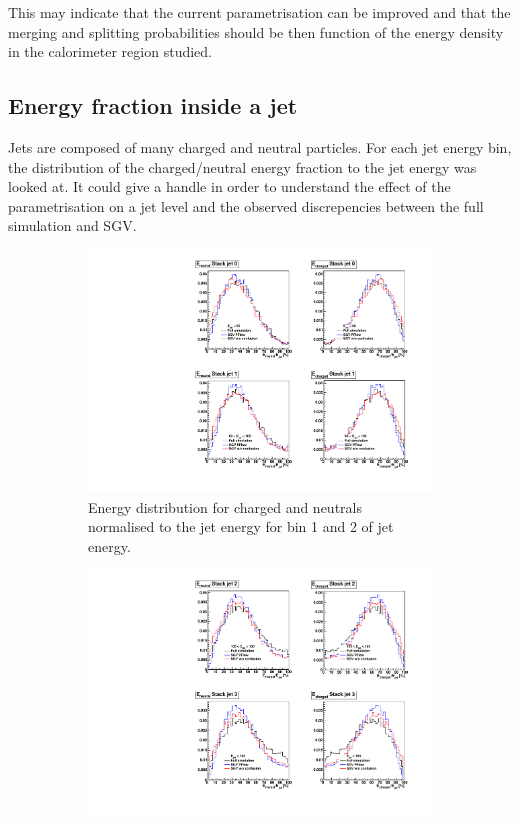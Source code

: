 This may indicate that the current parametrisation can be improved and that the merging and splitting probabilities should be then function of the energy density in the calorimeter region studied.

\subsection{Energy fraction inside a jet}

Jets are composed of many charged and neutral particles. For each jet energy bin, the distribution of the charged/neutral energy fraction to the jet energy was looked at. It could give a handle in order to understand the effect of the parametrisation on a jet level and the observed discrepencies between the full simulation and SGV.

\begin{figure}[htbp!]
  \centering
  \begin{subfigure}[t]{0.45\textwidth}
    \centering
    \includegraphics[width=1\linewidth]{Appendixes/fig_SGV/EneuEcha_binned_1.pdf}
    \caption{Energy distribution for charged and neutrals normalised to the jet energy for bin 1 and 2 of jet energy.} \label{fig:jet_track_level_bins12}
  \end{subfigure}
  \hfill
  \begin{subfigure}[t]{0.45\textwidth}
    \centering
    \includegraphics[width=1\linewidth]{Appendixes/fig_SGV/EneuEcha_binned_2.pdf}

\end{subfigure}
\end{figure}
